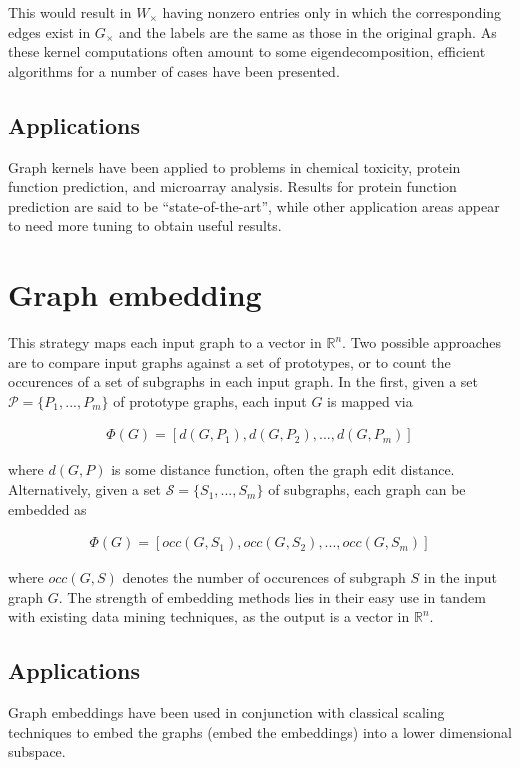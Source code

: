 \documentclass[11pt]{article}
\begin{document}
This would result in $W_\times$ having nonzero entries only in which the corresponding edges exist in $G_\times$ and the labels are the same as those in the original graph. As these kernel computations often amount to some eigendecomposition, efficient algorithms for a number of cases have been presented.

\subsection{Applications}

Graph kernels have been applied to problems in chemical toxicity, protein function prediction, and microarray analysis. Results for protein function prediction are said to be ``state-of-the-art'', while other application areas appear to need more tuning to obtain useful results.

\section{Graph embedding}

This strategy maps each input graph to a vector in $\mathbb{R}^n$. Two possible approaches are to compare input graphs against a set of prototypes, or to count the occurences of a set of subgraphs in each input graph. In the first, given a set $\mathcal{P} = \{P_1,...,P_m\}$ of prototype graphs, each input $G$ is mapped via

\begin{align}
\Phi(G)=[d(G,P_1), d(G,P_2),...,d(G,P_m)]
\end{align}

where $d(G, P)$ is some distance function, often the graph edit distance. Alternatively, given a set $\mathcal{S} = \{S_1,...,S_m\}$ of subgraphs, each graph can be embedded as

\begin{align}
\Phi(G)=[occ(G,S_1), occ(G,S_2),...,occ(G,S_m)]
\end{align}

where $occ(G, S)$ denotes the number of occurences of subgraph $S$ in the input graph $G$. The strength of embedding methods lies in their easy use in tandem with existing data mining techniques, as the output is a vector in $\mathbb{R}^n$.

\subsection{Applications}

Graph embeddings have been used in conjunction with classical scaling techniques to embed the graphs (embed the embeddings) into a lower dimensional subspace.



\end{document}
